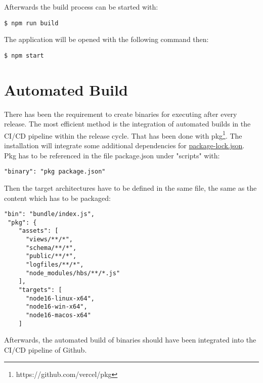 \documentclass[english, letterpaper, 10 pt]{report}
\begin{document}
\noindent Afterwards the build process can be started with:
\begin{lstlisting}[frame=single]
  $ npm run build
\end{lstlisting}

\noindent The application will be opened with the following command then:
\begin{lstlisting}[frame=single]
  $ npm start
\end{lstlisting}


\section*{Automated Build}
There has been the requirement to create binaries for executing after every release. 
The most efficient method is the integration of automated builds in the CI/CD pipeline within the release cycle.
That has been done with pkg\footnote{https://github.com/vercel/pkg}. The installation will integrate some additional dependencies for \href{https://github.com/amosproj/amos2022ss08-openid-connect-doctor/pull/60/commits/e927a44611477a41ef9a9a1d1430916fc07ef915#diff-053150b640a7ce75eff69d1a22cae7f0f94ad64ce9a855db544dda0929316519}{package-lock.json}.
\\

\noindent Pkg has to be referenced in the file package.json under "scripts" with:
\begin{lstlisting}[frame=single]
  "binary": "pkg package.json"
\end{lstlisting}

\newpage
\noindent Then the target architectures have to be defined in the same file, the same as the content which has to be packaged:

\begin{lstlisting}[frame=single]
"bin": "bundle/index.js",
 "pkg": {
    "assets": [
      "views/**/*",
      "schema/**/*",
      "public/**/*",
      "logfiles/**/*",
      "node_modules/hbs/**/*.js"
    ],
    "targets": [
      "node16-linux-x64",
      "node16-win-x64",
      "node16-macos-x64"
    ]
\end{lstlisting}


\noindent Afterwards, the automated build of binaries should have been integrated into the CI/CD pipeline of Github.
\\
\end{document}
